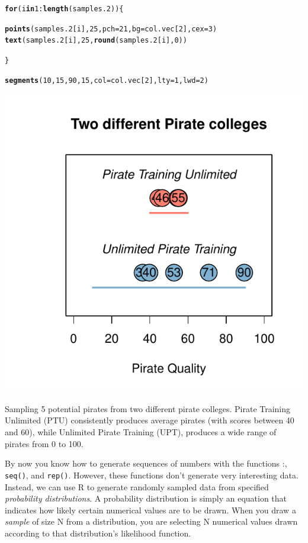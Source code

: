 \documentclass{tufte-book}\usepackage[]{graphicx}\usepackage[]{color}
\makeatletter
\def\maxwidth{ %
  \ifdim\Gin@nat@width>\linewidth
    \linewidth
  \else
    \Gin@nat@width
  \fi
}
\newcommand{\hlnum}[1]{\textcolor[rgb]{0.686,0.059,0.569}{#1}}%
\newcommand{\hlopt}[1]{\textcolor[rgb]{0,0,0}{#1}}%
\newcommand{\hlstd}[1]{\textcolor[rgb]{0.345,0.345,0.345}{#1}}%
\newcommand{\hlkwa}[1]{\textcolor[rgb]{0.161,0.373,0.58}{\textbf{#1}}}%
\newcommand{\hlkwc}[1]{\textcolor[rgb]{0.333,0.667,0.333}{#1}}%
\newcommand{\hlkwd}[1]{\textcolor[rgb]{0.737,0.353,0.396}{\textbf{#1}}}%
\newenvironment{kframe}{%
 \def\at@end@of@kframe{}%
 \ifinner\ifhmode%
  \def\at@end@of@kframe{\end{minipage}}%
  \begin{minipage}{\columnwidth}%
 \fi\fi%
 \def\FrameCommand##1{\hskip\@totalleftmargin \hskip-\fboxsep
 \colorbox{shadecolor}{##1}\hskip-\fboxsep
     \hskip-\linewidth \hskip-\@totalleftmargin \hskip\columnwidth}%
 \MakeFramed {\advance\hsize-\width
   \@totalleftmargin\z@ \linewidth\hsize
   \@setminipage}}%
 {\par\unskip\endMakeFramed%
 \at@end@of@kframe}
\newenvironment{knitrout}{}{} %
\makeatother
\begin{document}
\begin{marginfigure}
\begin{tiny}
\begin{knitrout}
\begin{kframe}
\begin{alltt}
\hlkwa{for}\hlstd{(i} \hlkwa{in} \hlnum{1}\hlopt{:}\hlkwd{length}\hlstd{(samples.2)) \{}

  \hlkwd{points}\hlstd{(samples.2[i],} \hlnum{25}\hlstd{,} \hlkwc{pch} \hlstd{=} \hlnum{21}\hlstd{,} \hlkwc{bg} \hlstd{= col.vec[}\hlnum{2}\hlstd{],} \hlkwc{cex} \hlstd{=} \hlnum{3}\hlstd{)}
  \hlkwd{text}\hlstd{(samples.2[i],} \hlnum{25}\hlstd{,} \hlkwd{round}\hlstd{(samples.2[i],} \hlnum{0}\hlstd{))}

\hlstd{\}}

\hlkwd{segments}\hlstd{(}\hlnum{10}\hlstd{,} \hlnum{15}\hlstd{,} \hlnum{90}\hlstd{,} \hlnum{15}\hlstd{,} \hlkwc{col} \hlstd{= col.vec[}\hlnum{2}\hlstd{],} \hlkwc{lty} \hlstd{=} \hlnum{1}\hlstd{,} \hlkwc{lwd} \hlstd{=} \hlnum{2}\hlstd{)}
\end{alltt}
\end{kframe}
\includegraphics[width=\maxwidth]{figure/unnamed-chunk-32-1} 

\end{knitrout}
\end{tiny}
\caption{Sampling 5 potential pirates from two different pirate colleges. Pirate Training Unlimited (PTU) consistently produces average pirates (with scores between 40 and 60), while Unlimited Pirate Training (UPT), produces a wide range of pirates from 0 to 100.}
\label{fig:piratecollege}
\end{marginfigure}
By now you know how to generate sequences of numbers with the functions :, \texttt{seq()}, and \texttt{rep()}. However, these functions don't generate very interesting data. Instead, we can use R to generate randomly sampled data from specified \textit{probability distributions}. A probability distribution is simply an equation that indicates how likely certain numerical values are to be drawn. When you draw a \textit{sample} of size N from a distribution, you are selecting N numerical values drawn according to that distribution's likelihood function.
\end{document}
